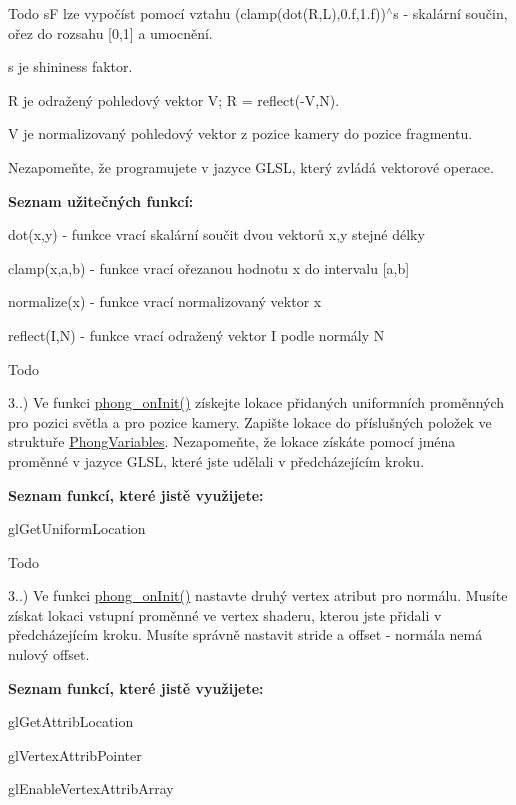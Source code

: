 \begin{DoxyRefDesc}{Todo}
 s\-F lze vypočíst pomocí vztahu (clamp(dot(\-R,\-L),0.\-f,1.\-f))$^\wedge$s -\/ skalární součin, ořez do rozsahu \mbox{[}0,1\mbox{]} a umocnění.\par
 s je shininess faktor.\par
 R je odražený pohledový vektor V; R = reflect(-\/\-V,N).\par
 V je normalizovaný pohledový vektor z pozice kamery do pozice fragmentu.\par
 \par
 Nezapomeňte, že programujete v jazyce G\-L\-S\-L, který zvládá vektorové operace.\par
 {\bfseries Seznam užitečných funkcí\-:}
\begin{DoxyItemize}
\item dot(x,y) -\/ funkce vrací skalární součit dvou vektorů x,y stejné délky
\item clamp(x,a,b) -\/ funkce vrací ořezanou hodnotu x do intervalu \mbox{[}a,b\mbox{]}
\item normalize(x) -\/ funkce vrací normalizovaný vektor x
\item reflect(\-I,\-N) -\/ funkce vrací odražený vektor I podle normály N 
\end{DoxyItemize}\end{DoxyRefDesc}
\begin{DoxyRefDesc}{Todo}
\item[\hyperlink{todo__todo000006}{Todo}]3..) Ve funkci \hyperlink{student_8h_ac2adb2ba4e748239b9db4d037584d3cc}{phong\-\_\-on\-Init()} získejte lokace přidaných uniformních proměnných pro pozici světla a pro pozice kamery. Zapište lokace do příslušných položek ve struktuře \hyperlink{structPhongVariables}{Phong\-Variables}. Nezapomeňte, že lokace získáte pomocí jména proměnné v jazyce G\-L\-S\-L, které jste udělali v předcházejícím kroku.\par
 {\bfseries Seznam funkcí, které jistě využijete\-:}
\begin{DoxyItemize}
\item gl\-Get\-Uniform\-Location 
\end{DoxyItemize}\end{DoxyRefDesc}


\begin{DoxyRefDesc}{Todo}
\item[\hyperlink{todo__todo000007}{Todo}]3..) Ve funkci \hyperlink{student_8h_ac2adb2ba4e748239b9db4d037584d3cc}{phong\-\_\-on\-Init()} nastavte druhý vertex atribut pro normálu. Musíte získat lokaci vstupní proměnné ve vertex shaderu, kterou jste přidali v předcházejícím kroku. Musíte správně nastavit stride a offset -\/ normála nemá nulový offset.\par
 {\bfseries Seznam funkcí, které jistě využijete\-:}
\begin{DoxyItemize}
\item gl\-Get\-Attrib\-Location
\item gl\-Vertex\-Attrib\-Pointer
\item gl\-Enable\-Vertex\-Attrib\-Array 
\end{DoxyItemize}\end{DoxyRefDesc}



